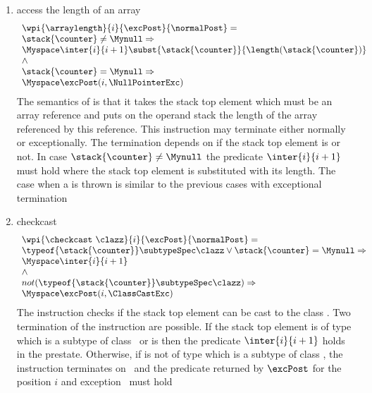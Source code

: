 \begin{itemize}
\begin{enumerate}
					\item access the length of an array 
					$$\begin{array}{l}
					        \wpi{\arraylength } {i} {\excPost}{\normalPost}  =  \\
					 				\stack{\counter } \ne \Mynull \Rightarrow \\
									\Myspace \inter{i}{i+1}
									 \subst{ \stack{\counter } }{ \length(\stack{\counter } )  } \\
									 \wedge \\
								\stack{\counter } = \Mynull \Rightarrow \\
								\Myspace   \excPost( i, \NullPointerExc) \\
					  \end{array} $$
					  The semantics of \arraylength is that it takes the stack top element which must be an array reference
					  and puts on the operand stack the length of the array referenced by this reference. This instruction
					  may terminate either normally or exceptionally. The termination depends on if the stack top element is 
					  \Mynull or not. In case $\stack{\counter} \neq \Mynull$ the predicate  $\inter{i}{i+1}$ must hold where
					  the stack top element is substituted with its length. The case when a \NullPointerExc is thrown is similar
					  to the previous cases with exceptional termination
					  
					  
					\item checkcast 
						$$ \begin{array}{l} 
						\wpi{\checkcast  \ \clazz } {i} {\excPost}{\normalPost}  = \\
							\typeof{\stack{\counter}}  \subtypeSpec  \clazz \vee  \stack{\counter} = \Mynull \Rightarrow \\
							     	\Myspace   \inter{i}{i+1}\\
							
							 \wedge \\
							
							not(  \typeof{\stack{\counter}} \subtypeSpec  \clazz  ) \Rightarrow  \\
							\Myspace    \excPost( i, \ClassCastExc) \\
						\end{array}$$  
					  The instruction checks if the stack top element can be cast to the class \clazz. 
					  Two termination of the instruction  are possible. If the stack top element \stack{\counter} is of type 
					  which is a subtype of class \clazz \  or is \Mynull then the predicate $ \inter{i}{i+1} $ holds in the prestate.
					  Otherwise, if   \stack{\counter} is not of type which is a subtype of class \clazz, the instruction terminates
					  on \ClassCastExc \ and the predicate returned by $\excPost$ for the position $i$ and exception \ClassCastExc  \
					  must hold 
					  

\end{enumerate}
\end{itemize}
